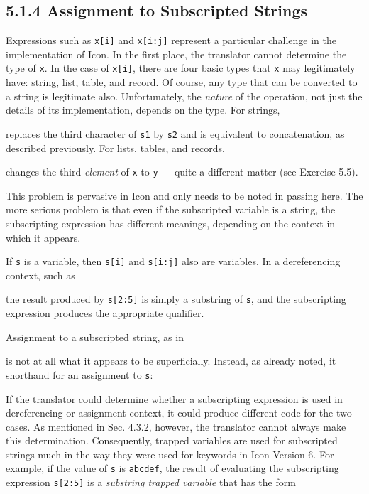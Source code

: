 \subsection[5.1.4 Assignment to Subscripted Strings]{5.1.4 Assignment to Subscripted Strings}

Expressions such as \texttt{x[i]} and \texttt{x[i:j]} represent a
particular challenge in the implementation of Icon. In the first
place, the translator cannot determine the type of \texttt{x}. In the case of
\texttt{x[i]}, there are four basic types that \texttt{x} may
legitimately have: string, list, table, and record. Of course, any
type that can be converted to a string is legitimate
also. Unfortunately, the \textit{nature }of the operation, not just
the details of its implementation, depends on the type. For strings,


\noindent replaces the third character of \texttt{s1} by \texttt{s2}
and is equivalent to concatenation, as described previously.  For
lists, tables, and records,


\noindent changes the third \textit{element }of \texttt{x} to
\texttt{y} --- quite a different matter (see Exercise 5.5).

This problem is pervasive in Icon and only needs to be noted in
passing here. The more serious problem is that even if the subscripted
variable is a string, the subscripting expression has different
meanings, depending on the context in which it appears.

If \texttt{s} is a variable, then \texttt{s[i]} and \texttt{s[i:j]}
also are variables. In a dereferencing context, such as


\noindent the result produced by \texttt{s[2:5]} is simply a substring
of \texttt{s}, and the subscripting expression produces the
appropriate qualifier.

Assignment to a subscripted string, as in


\noindent is not at all what it appears to be superficially. Instead,
as already noted, it shorthand for an assignment to \texttt{s}:


If the translator could determine whether a subscripting expression is
used in dereferencing or assignment context, it could produce
different code for the two cases. As mentioned in Sec. 4.3.2, however,
the translator cannot always make this determination. Consequently,
trapped variables are used for subscripted strings much in the way they
were used for keywords in Icon Version 6. For example, if the value of \texttt{s} is
\texttt{{\textquotedbl}abcdef{\textquotedbl}}, the result of
evaluating the subscripting expression \texttt{s[2:5]} is a
\textit{substring trapped variable} that has the form


